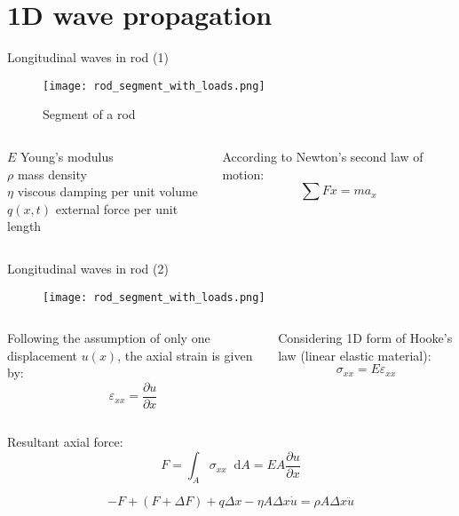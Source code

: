 \documentclass[10pt,aspectratio=169]{beamer} %
\DeclareRobustCommand*{\drv}{\mathop{}\!\mathrm{d}}
\begin{document}
\section{1D wave propagation}
\begin{frame}[t]{Longitudinal waves in rod (1)}
\begin{figure}
\texttt{[image: rod\_segment\_with\_loads.png]}
\caption{Segment of a rod}
\end{figure}
\begin{columns}[T]
	\begin{column}{0.5\textwidth}
		\(E\) Young's modulus\\
		\(\rho\) mass density\\
		\(\eta\) viscous damping per unit volume\\
		\(q(x,t)\) external force per unit length\\
	\end{column}
	\begin{column}{0.5\textwidth}
		According to Newton's second law of motion:
		\begin{equation*}
		\sum Fx = m a_x
		\end{equation*}
	\end{column}
\end{columns}		


\end{frame}
\note{
}
\begin{frame}[t]{Longitudinal waves in rod (2)}
	\begin{figure}
		\texttt{[image: rod\_segment\_with\_loads.png]}
	\end{figure}
\begin{columns}[T]
	\begin{column}{0.5\textwidth}
			Following the assumption of only one displacement \(u(x)\), the axial strain is given by:
		\begin{equation*}
		\varepsilon_{xx}  = \frac{\partial u}{\partial x}
		\end{equation*}
	\end{column}
	\begin{column}{0.5\textwidth}
		Considering 1D form of Hooke's law (linear elastic material):
		\begin{equation*}
		\sigma_{xx} = E \varepsilon_{xx}
		\end{equation*}
	\end{column}
\end{columns}
	Resultant axial force:
	\begin{equation*}
	F=\int_A \sigma_{xx} \drv A = EA \frac{\partial u}{\partial x}
	\end{equation*}
	
	\begin{equation*}
    -F + (F + \Delta F) + q \Delta x - \eta A \Delta x \dot{u} = \rho A \Delta x \ddot{u}
	\end{equation*}
\end{frame}
\end{document}
